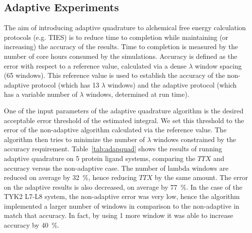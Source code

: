 \subsection{Adaptive Experiments}

 

The aim of introducing adaptive quadrature to alchemical free energy
calculation protocols (e.g. TIES) is to reduce time to completion while
maintaining (or increasing) the accuracy of the results. Time to completion
is measured by the number of core hours consumed by the simulations. Accuracy
is defined as the error with respect to a reference value, calculated via a
dense $\lambda$ window spacing (65 windows). This reference value is used to
establish the accuracy of the non-adaptive protocol (which has 13 $\lambda$
windows) and the adaptive protocol (which has a variable number of $\lambda$
windows, determined at run time).

One of the input parameters of the adaptive quadrature algorithm is the
desired acceptable error threshold of the estimated integral. We set this
threshold to the error of the non-adaptive algorithm calculated via the
reference value. The algorithm then tries to minimize the number of $\lambda$
windows constrained by the accuracy requirement. Table~\ref{tab:adapquad}
shows the results of running adaptive quadrature on 5 protein ligand systems,
comparing the \(TTX\) and accuracy versus the non-adaptive case. The number
of lambda windows are reduced on average by \SI{32}{\percent}, hence reducing
\(TTX\) by the same amount. The error on the adaptive results is also
decreased, on average by \SI{77}{\percent}. In the case of the TYK2 L7-L8
system, the non-adaptive error was very low, hence the algorithm implemented
a larger number of windows in comparison to the non-adaptive in match that
accuracy. In fact, by using 1 more window it was able to increase accuracy by
\SI{40}{\percent}.

